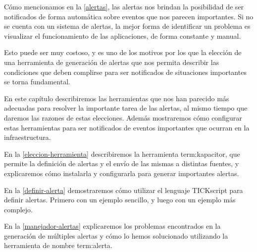 Cómo mencionamos en la \autoref{alertas}, las alertas nos brindan la
posibilidad de ser notificados de forma automática sobre eventos que nos
parecen importantes.  Si no se cuenta con un sistema de alertas, la mejor forma
de identificar un problema es visualizar el funcionamiento de las aplicaciones,
de forma constante y manual.

Esto puede ser muy costoso, y es uno de los motivos por los que la elección de
una herramienta de generación de alertas que nos permita describir las
condiciones que deben complirse para ser notificados de situaciones importantes
se torna fundamental.

En este capítulo describiremos las herramientas que nos han parecido más
adecuadas para resolver la importante tarea de las alertas, al mismo tiempo que
daremos las razones de estas elecciones. Además mostraremos cómo configurar
estas herramientas para ser notificados de eventos importantes que ocurran en
la infraestructura.

En la \autoref{eleccion-herramienta} describiremos la herramienta
\gls{term:kapacitor}, que permite la definición de alertas y el envío de las
mismas a distintas fuentes, y explicaremos cómo instalarla y configurarla para
generar importantes alertas.

En la \autoref{definir-alerta} demostraremos cómo utilizar el lenguaje
TICKscript para definir alertas. Primero con un ejemplo sencillo, y luego con
un ejemplo más complejo.

En la \autoref{manejador-alertas} explicaremos los problemas encontrados en la
generación de múltiples alertas y cómo lo hemos solucionado utilizando la
herramienta de nombre \gls{term:alerta}.
